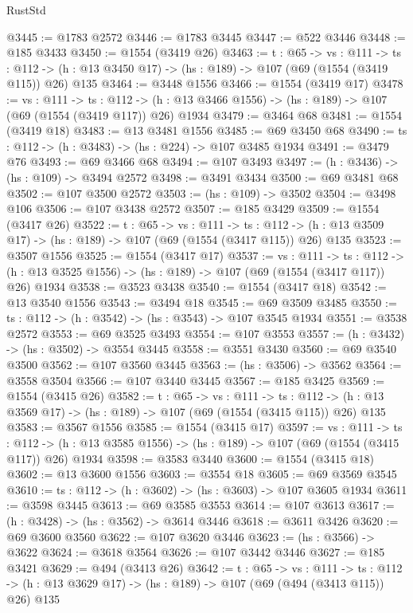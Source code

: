 \begin{lexlean}{RustStd}
\begin{coremodule}
{\begin{coremodule}
{{{{{{{{{@3445 := @1783 @2572
@3446 := @1783 @3445
@3447 := @522 @3446
@3448 := @185 @3433
@3450 := @1554 (@3419 @26)
@3463 := {t : @65} ->
  {vs : @111} ->
  {ts : @112} -> (h : @13 @3450 @17) -> (hs : @189) -> @107 (@69 (@1554 (@3419 @115)) @26) @135
@3464 := @3448 @1556
@3466 := @1554 (@3419 @17)
@3478 := {vs : @111} ->
  {ts : @112} -> (h : @13 @3466 @1556) -> (hs : @189) -> @107 (@69 (@1554 (@3419 @117)) @26) @1934
@3479 := @3464 @68
@3481 := @1554 (@3419 @18)
@3483 := @13 @3481 @1556
@3485 := @69 @3450 @68
@3490 := {ts : @112} -> (h : @3483) -> (hs : @224) -> @107 @3485 @1934
@3491 := @3479 @76
@3493 := @69 @3466 @68
@3494 := @107 @3493
@3497 := (h : @3436) -> (hs : @109) -> @3494 @2572
@3498 := @3491 @3434
@3500 := @69 @3481 @68
@3502 := @107 @3500 @2572
@3503 := (hs : @109) -> @3502
@3504 := @3498 @106
@3506 := @107 @3438 @2572
@3507 := @185 @3429
@3509 := @1554 (@3417 @26)
@3522 := {t : @65} ->
  {vs : @111} ->
  {ts : @112} -> (h : @13 @3509 @17) -> (hs : @189) -> @107 (@69 (@1554 (@3417 @115)) @26) @135
@3523 := @3507 @1556
@3525 := @1554 (@3417 @17)
@3537 := {vs : @111} ->
  {ts : @112} -> (h : @13 @3525 @1556) -> (hs : @189) -> @107 (@69 (@1554 (@3417 @117)) @26) @1934
@3538 := @3523 @3438
@3540 := @1554 (@3417 @18)
@3542 := @13 @3540 @1556
@3543 := @3494 @18
@3545 := @69 @3509 @3485
@3550 := {ts : @112} -> (h : @3542) -> (hs : @3543) -> @107 @3545 @1934
@3551 := @3538 @2572
@3553 := @69 @3525 @3493
@3554 := @107 @3553
@3557 := (h : @3432) -> (hs : @3502) -> @3554 @3445
@3558 := @3551 @3430
@3560 := @69 @3540 @3500
@3562 := @107 @3560 @3445
@3563 := (hs : @3506) -> @3562
@3564 := @3558 @3504
@3566 := @107 @3440 @3445
@3567 := @185 @3425
@3569 := @1554 (@3415 @26)
@3582 := {t : @65} ->
  {vs : @111} ->
  {ts : @112} -> (h : @13 @3569 @17) -> (hs : @189) -> @107 (@69 (@1554 (@3415 @115)) @26) @135
@3583 := @3567 @1556
@3585 := @1554 (@3415 @17)
@3597 := {vs : @111} ->
  {ts : @112} -> (h : @13 @3585 @1556) -> (hs : @189) -> @107 (@69 (@1554 (@3415 @117)) @26) @1934
@3598 := @3583 @3440
@3600 := @1554 (@3415 @18)
@3602 := @13 @3600 @1556
@3603 := @3554 @18
@3605 := @69 @3569 @3545
@3610 := {ts : @112} -> (h : @3602) -> (hs : @3603) -> @107 @3605 @1934
@3611 := @3598 @3445
@3613 := @69 @3585 @3553
@3614 := @107 @3613
@3617 := (h : @3428) -> (hs : @3562) -> @3614 @3446
@3618 := @3611 @3426
@3620 := @69 @3600 @3560
@3622 := @107 @3620 @3446
@3623 := (hs : @3566) -> @3622
@3624 := @3618 @3564
@3626 := @107 @3442 @3446
@3627 := @185 @3421
@3629 := @494 (@3413 @26)
@3642 := {t : @65} ->
  {vs : @111} ->
  {ts : @112} -> (h : @13 @3629 @17) -> (hs : @189) -> @107 (@69 (@494 (@3413 @115)) @26) @135
}}}}}}}}}
\end{coremodule}}
\end{coremodule}
\end{lexlean}
